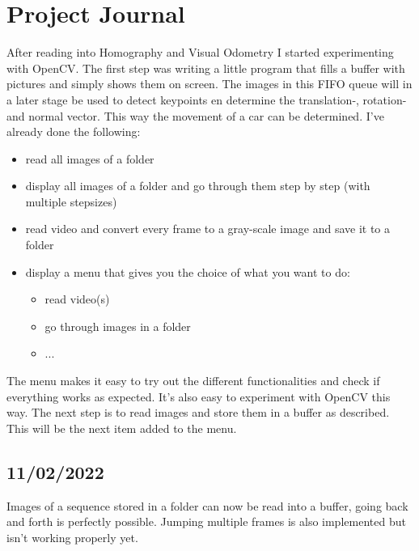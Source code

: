 \chapter{Project Journal}

After reading into Homography and Visual Odometry I started experimenting with OpenCV. The first step was writing a little program that fills a buffer with pictures and simply shows them on screen. The images in this FIFO queue will in a later stage be used to detect keypoints en determine the translation-, rotation- and normal vector. This way the movement of a car can be determined.
\newline\newline
I've already done the following:
\begin{itemize}
    \item read all images of a folder
    \item display all images of a folder and go through them step by step (with multiple stepsizes)
    \item read video and convert every frame to a gray-scale image and save it to a folder
    \item display a menu that gives you the choice of what you want to do:
    \begin{itemize}
        \item read video(s)
        \item go through images in a folder
        \item ...
    \end{itemize}
    
\end{itemize}
The menu makes it easy to try out the different functionalities and check if everything works as expected. It's also easy to experiment with OpenCV this way.
The next step is to read images and store them in a buffer as described. This will be the next item added to the menu.

\section{11/02/2022}
Images of a sequence stored in a folder can now be read into a buffer, going back and forth is perfectly possible. Jumping multiple frames is also implemented but isn't working properly yet.

